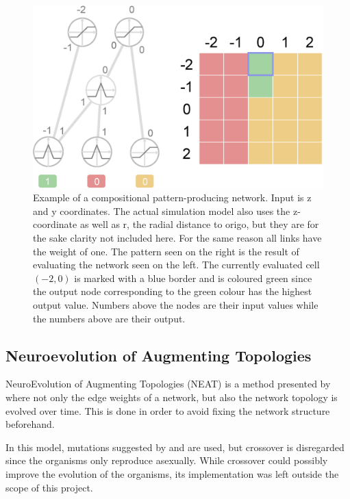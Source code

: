 \begin{figure}[H]
  \centering
  \includegraphics[width=\textwidth]{figure/CPPN2}
  \caption{
  Example of a compositional pattern-producing network. Input is z and y coordinates. The actual simulation model also uses the z-coordinate as well as r, the radial distance to origo, but they are for the sake clarity not included here. For the same reason all links have the weight of one. The pattern seen on the right is the result of evaluating the network seen on the left. The currently evaluated cell \((-2,0)\) is marked with a blue border and is coloured green since the output node corresponding to the green colour has the highest output value. Numbers above the nodes are their input values while the numbers above are their output.
  }
  \label{fig:cppn} 
\end{figure}

\subsection{Neuroevolution of Augmenting
Topologies} \label{subsec:NEAT}
NeuroEvolution of Augmenting Topologies (NEAT) is a method presented by \cite{stanley2002evolving} where not only the edge weights of a network, but also the network topology is evolved over time. This is done in order to avoid fixing the network structure beforehand. 

In this model, mutations suggested by \cite{stanley2002evolving} and \cite{stanley2007compositional} are used, but crossover is disregarded since the organisms only reproduce asexually. While crossover could possibly improve the evolution of the organisms, its implementation was left outside the scope of this project.

